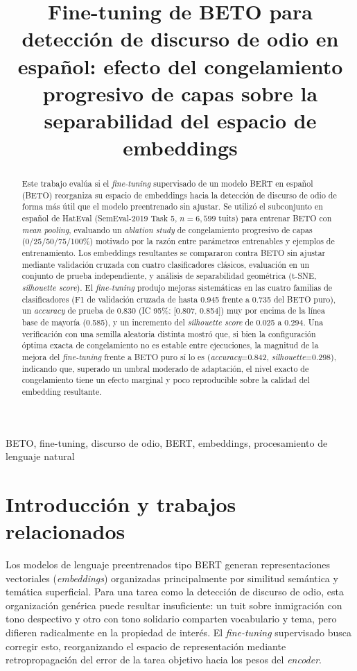 \documentclass[conference]{IEEEtran}
\title{Fine-tuning de BETO para detección de discurso de odio en español: efecto del congelamiento progresivo de capas sobre la separabilidad del espacio de embeddings}
\author{
\IEEEauthorblockN{Fernando José Soto Jácome}
\IEEEauthorblockA{Departamento de Inteligencia Artificial \\
Universidad San Francisco de Quito (USFQ) \\
fsotoj@estud.usfq.edu.ec}
}
\begin{document}
\maketitle

\begin{abstract}
Este trabajo evalúa si el \textit{fine-tuning} supervisado de un modelo BERT en español (BETO) reorganiza su espacio de embeddings hacia la detección de discurso de odio de forma más útil que el modelo preentrenado sin ajustar. Se utilizó el subconjunto en español de HatEval (SemEval-2019 Task 5, $n=6{,}599$ tuits) para entrenar BETO con \textit{mean pooling}, evaluando un \textit{ablation study} de congelamiento progresivo de capas (0/25/50/75/100\%) motivado por la razón entre parámetros entrenables y ejemplos de entrenamiento. Los embeddings resultantes se compararon contra BETO sin ajustar mediante validación cruzada con cuatro clasificadores clásicos, evaluación en un conjunto de prueba independiente, y análisis de separabilidad geométrica (t-SNE, \textit{silhouette score}). El \textit{fine-tuning} produjo mejoras sistemáticas en las cuatro familias de clasificadores (F1 de validación cruzada de hasta 0.945 frente a 0.735 del BETO puro), un \textit{accuracy} de prueba de 0.830 (IC 95\%: {[}0.807, 0.854{]}) muy por encima de la línea base de mayoría (0.585), y un incremento del \textit{silhouette score} de 0.025 a 0.294. Una verificación con una semilla aleatoria distinta mostró que, si bien la configuración óptima exacta de congelamiento no es estable entre ejecuciones, la magnitud de la mejora del \textit{fine-tuning} frente a BETO puro sí lo es (\textit{accuracy}=0.842, \textit{silhouette}=0.298), indicando que, superado un umbral moderado de adaptación, el nivel exacto de congelamiento tiene un efecto marginal y poco reproducible sobre la calidad del embedding resultante.
\end{abstract}

\begin{IEEEkeywords}
BETO, fine-tuning, discurso de odio, BERT, embeddings, procesamiento de lenguaje natural
\end{IEEEkeywords}

\section{Introducción y trabajos relacionados}

Los modelos de lenguaje preentrenados tipo BERT \cite{devlin2019bert} generan representaciones vectoriales (\textit{embeddings}) organizadas principalmente por similitud semántica y temática superficial. Para una tarea como la detección de discurso de odio, esta organización genérica puede resultar insuficiente: un tuit sobre inmigración con tono despectivo y otro con tono solidario comparten vocabulario y tema, pero difieren radicalmente en la propiedad de interés. El \textit{fine-tuning} supervisado busca corregir esto, reorganizando el espacio de representación mediante retropropagación del error de la tarea objetivo hacia los pesos del \textit{encoder}.
\end{document}
